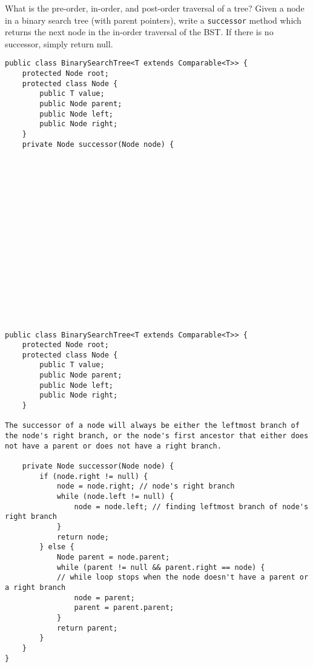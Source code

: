 \question What is the pre-order, in-order, and post-order traversal of a tree?
\newline
\newline
\newline
\question Given a node in a binary search tree (with parent pointers), write a \texttt{successor} method which returns the next node in the in-order traversal of the BST. If there is no successor, simply return null.

\ifprintanswers
\else
\begin{lstlisting}
public class BinarySearchTree<T extends Comparable<T>> {
    protected Node root;
    protected class Node {
        public T value;
        public Node parent;
        public Node left;
        public Node right;
    }
    private Node successor(Node node) {


















\end{lstlisting}
\fi

\begin{solution}
\begin{lstlisting}
public class BinarySearchTree<T extends Comparable<T>> {
    protected Node root;
    protected class Node {
        public T value;
        public Node parent;
        public Node left;
        public Node right;
    }
    
The successor of a node will always be either the leftmost branch of the node's right branch, or the node's first ancestor that either does not have a parent or does not have a right branch.
    
    private Node successor(Node node) {
        if (node.right != null) {
            node = node.right; // node's right branch
            while (node.left != null) {
                node = node.left; // finding leftmost branch of node's right branch
            }
            return node;
        } else {
            Node parent = node.parent;
            while (parent != null && parent.right == node) { 
            // while loop stops when the node doesn't have a parent or a right branch
                node = parent;
                parent = parent.parent; 
            }
            return parent;
        }
    }
}
\end{lstlisting}
\end{solution}